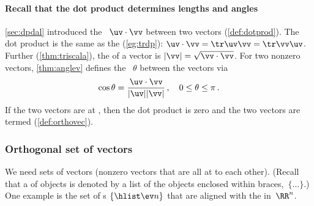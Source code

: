\paragraph{Recall that the dot product determines lengths and angles}
\cref{sec:dpdal} introduced the ~\(\uv\cdot\vv\) between two vectors (\cref{def:dotprod}).
The dot product is the same as the  (\cref{eg:trdp}): \(\uv\cdot\vv=\tr\uv\vv=\tr\vv\uv\).
Further (\cref{thm:triscala}), the  of a vector is \(|\vv|=\sqrt{\vv\cdot\vv}\).
For two nonzero vectors, \cref{thm:anglev} defines the ~\(\theta\) between the vectors via 
\begin{equation*}
\cos\theta=\frac{\uv\cdot\vv}{|\uv||\vv|}\,,
\quad 0\leq\theta\leq\pi\,.
\end{equation*}
If the two vectors are at , then the dot product is zero and the two vectors are termed  (\cref{def:orthovec}).









\subsubsection{Orthogonal set of vectors}


We need sets of  vectors (nonzero vectors that are all at  to each other).
(Recall that a  of objects is denoted by a list of the objects enclosed within braces,~\(\{\ldots\}\).)
One example is the set of s \(\{\hlist\ev n\}\) that are aligned with the  in~\(\RR^n\).  

